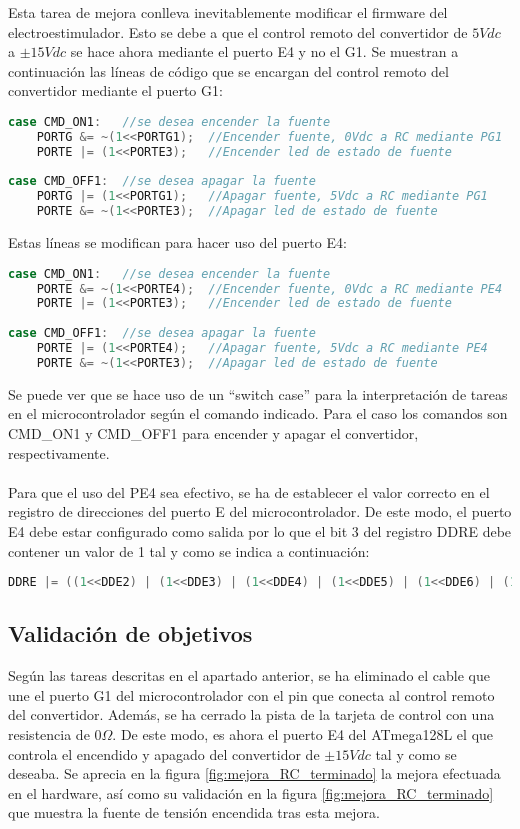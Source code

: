 Esta tarea de mejora conlleva inevitablemente modificar el firmware del electroestimulador. Esto se debe a que el control remoto del convertidor de $5Vdc$ a $\pm15Vdc$ se hace ahora mediante el puerto E4 y no el G1. Se muestran a continuación las líneas de código que se encargan del control remoto del convertidor mediante el puerto G1:

\begin{lstlisting}[language=C++,breaklines]
case CMD_ON1:	//se desea encender la fuente 
	PORTG &= ~(1<<PORTG1);	//Encender fuente, 0Vdc a RC mediante PG1
	PORTE |= (1<<PORTE3);	//Encender led de estado de fuente
	
case CMD_OFF1:	//se desea apagar la fuente 
	PORTG |= (1<<PORTG1);	//Apagar fuente, 5Vdc a RC mediante PG1
	PORTE &= ~(1<<PORTE3);	//Apagar led de estado de fuente
\end{lstlisting}

Estas líneas se modifican para hacer uso del puerto E4:

\begin{lstlisting}[language=C++,breaklines]
case CMD_ON1:	//se desea encender la fuente 
	PORTE &= ~(1<<PORTE4);	//Encender fuente, 0Vdc a RC mediante PE4
	PORTE |= (1<<PORTE3);	//Encender led de estado de fuente
	
case CMD_OFF1:	//se desea apagar la fuente 
	PORTE |= (1<<PORTE4);	//Apagar fuente, 5Vdc a RC mediante PE4
	PORTE &= ~(1<<PORTE3);	//Apagar led de estado de fuente
\end{lstlisting}

Se puede ver que se hace uso de un ``switch case'' para la interpretación de tareas en el microcontrolador según el comando indicado. Para el caso los comandos son CMD\_ON1 y CMD\_OFF1 para encender y apagar el convertidor, respectivamente. 
\\
\\
Para que el uso del PE4 sea efectivo, se ha de establecer el valor correcto en el registro de direcciones del puerto E del microcontrolador. De este modo, el puerto E4 debe estar configurado como salida por lo que el bit 3 del registro DDRE debe contener un valor de 1 tal y como se indica a continuación:

\begin{lstlisting}[language=C++,breaklines]
DDRE |= ((1<<DDE2) | (1<<DDE3) | (1<<DDE4) | (1<<DDE5) | (1<<DDE6) | (1<<DDE7));
\end{lstlisting}
\subsection{Validación de objetivos}
Según las tareas descritas en el apartado anterior, se ha eliminado el cable que une el puerto G1 del microcontrolador con el pin que conecta al control remoto del convertidor. Además, se ha cerrado la pista de la tarjeta de control con una resistencia de $0\Omega$. De este modo, es ahora el puerto E4 del ATmega128L el que controla el encendido y apagado del convertidor de $\pm15Vdc$ tal y como se deseaba. Se aprecia en la figura \ref{fig:mejora_RC_terminado} la mejora efectuada en el hardware, así como su validación en la figura \ref{fig:mejora_RC_terminado} que muestra la fuente de tensión encendida tras esta mejora.\\

